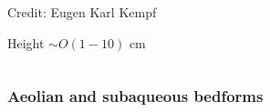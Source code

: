 \documentclass{beamer}
\begin{document}
\begin{frame}
\begin{columns}[t]
\begin{column}{0.5\paperwidth}
        \vspace{-0.8cm}

        \tiny Credit: Eugen Karl Kempf

        \vspace{0.9cm}

        \normalsize Height $\sim O(1 - 10)$ cm

      \end{column}

    \end{columns}

\end{frame}

\begin{frame}
  \frametitle{Aeolian and subaqueous bedforms}


\end{frame}
\end{document}
